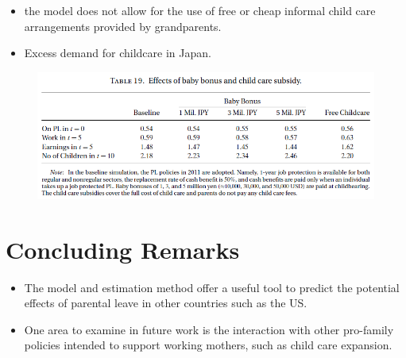 \documentclass[../root]{subfiles}
\begin{document}
    \begin{itemize}
      \item the model does not allow for the use of free or cheap informal child care arrangements provided by grandparents.
      \item Excess demand for childcare in Japan.
    \end{itemize}

    \begin{figure}[h]
      \centering
      \includegraphics[scale = 1]{0619tanji/T19}
      \label{T10}
    \end{figure}

    \section{Concluding Remarks}

    \begin{itemize}
      \item The model and estimation method offer a useful tool to predict the potential effects of parental leave in other countries such as the US.
      \item One area to examine in future work is the interaction with other pro-family policies intended to support working mothers, such as child care expansion.
    \end{itemize}

    \biblio
\end{document}
